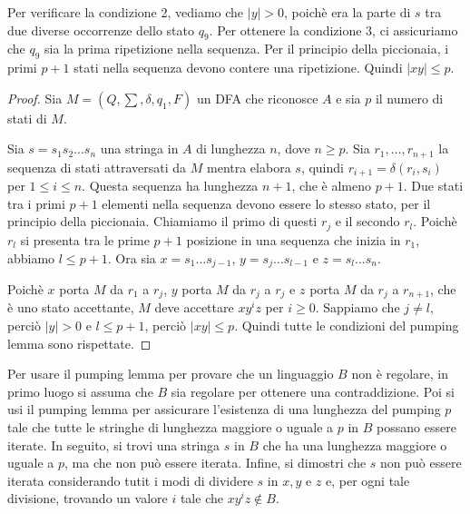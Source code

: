 \documentclass[12pt]{report}
\newcounter{lemma}
\begin{document}
	Per verificare la condizione 2, vediamo che $|y| > 0$, poichè era la parte di $s$ tra due diverse occorrenze dello stato $q_9$. Per ottenere la condizione 3, ci assicuriamo che $q_9$ sia la prima ripetizione nella sequenza. Per il principio della piccionaia, i primi $p + 1$ stati nella sequenza devono contere una ripetizione. Quindi $|xy| \leq p$.
	\begin{proof}
		Sia $M = (Q, \sum, \delta, q_1, F)$ un DFA che riconosce $A$ e sia $p$ il numero di stati di $M$.

		Sia $s = s_1s_2\dots s_n$ una stringa in $A$ di lunghezza $n$, dove $n \geq p$. Sia $r_1, \dots, r_{n+1}$ la sequenza di stati attraversati da $M$ mentra elabora $s$, quindi $r_{i+1} =\delta(r_i, s_i)$ per $1 \leq i \leq n$. Questa sequenza ha lunghezza $n+1$, che è almeno $p +1$. Due stati tra i primi $p+1$ elementi nella sequenza devono essere lo stesso stato, per il principio della piccionaia. Chiamiamo il primo di questi $r_j$ e il secondo $r_l$. Poichè $r_l$ si presenta tra le prime $p+1$ posizione in una sequenza che inizia in $r_1$, abbiamo $l \leq p + 1$. Ora sia $x = s_1\dots s_{j-1}$, $y=s_j\dots s_{l-1}$ e $z=s_l\dots s_n$.

		Poichè $x$ porta $M$ da $r_1$ a $r_j$, $y$ porta $M$ da $r_j$ a $r_j$ e $z$ porta $M$ da $r_j$ a $r_{n+1}$, che è uno stato accettante, $M$ deve accettare $xy^iz$ per $i \geq 0$. Sappiamo che $j \neq l$, perciò $|y| > 0$ e $l \leq p + 1$, perciò $|xy| \leq p$. Quindi tutte le condizioni del pumping lemma sono rispettate.
	\end{proof}
	Per usare il pumping lemma per provare che un linguaggio $B$ non è regolare, in primo luogo si assuma che $B$ sia regolare per ottenere una contraddizione. Poi si usi il pumping lemma per assicurare l'esistenza di una lunghezza del pumping $p$ tale che tutte le stringhe di lunghezza maggiore o uguale a $p$ in $B$ possano essere iterate. In seguito, si trovi una stringa $s$ in $B$ che ha una lunghezza maggiore o uguale a $p$, ma che non può essere iterata. Infine, si dimostri che $s$ non può essere iterata considerando tutit i modi di dividere $s$ in $x, y$ e $z$ e, per ogni tale divisione, trovando un valore $i$ tale che $xy^iz\notin B$.
\end{document}
